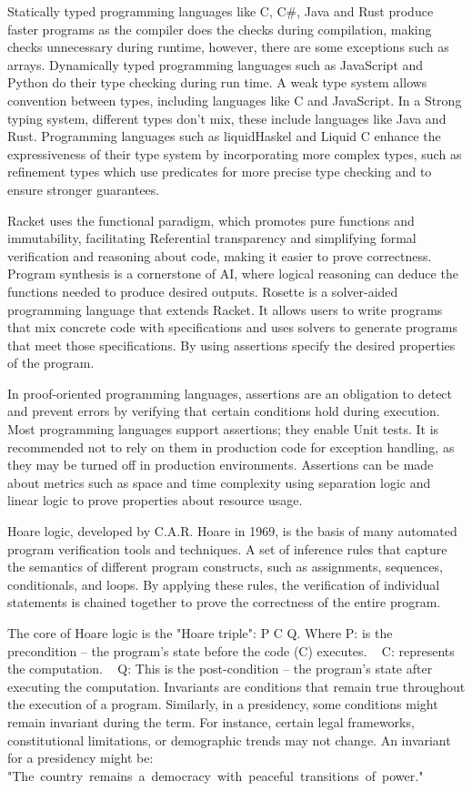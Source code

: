 \documentclass{article}
\begin{document}
Statically typed programming languages like C,  C\#, Java and Rust produce faster programs as the compiler does the checks during compilation, making checks unnecessary during runtime, however, there are some exceptions such as arrays. Dynamically typed programming languages such as JavaScript and Python do their type checking during run time. A weak type system allows convention between types, including languages like C and JavaScript. In a Strong typing system, different types don't mix, these include languages like Java and Rust. Programming languages such as liquidHaskel and Liquid C enhance the expressiveness of their type system by incorporating more complex types, such as refinement types which use predicates for more precise type checking and to ensure stronger guarantees.
 
Racket uses the functional paradigm, which promotes pure functions and immutability, facilitating Referential transparency and simplifying formal verification and reasoning about code, making it easier to prove correctness. Program synthesis is a cornerstone of AI, where logical reasoning can deduce the functions needed to produce desired outputs.  Rosette is a solver-aided programming language that extends Racket. It allows users to write programs that mix concrete code with specifications and uses solvers to generate programs that meet those specifications. By using assertions specify the desired properties of the program.

In proof-oriented programming languages, assertions are an obligation to detect and prevent errors by verifying that certain conditions hold during execution. Most programming languages support assertions; they enable Unit tests. It is recommended not to rely on them in production code for exception handling, as they may be turned off in production environments. Assertions can be made about metrics such as space and time complexity using separation logic and linear logic to prove properties about resource usage. 

Hoare logic, developed by C.A.R. Hoare in 1969, is the basis of many automated program verification tools and techniques. A set of inference rules that capture the semantics of different program constructs, such as assignments, sequences, conditionals, and loops. By applying these rules, the verification of individual statements is chained together to prove the correctness of the entire program. 

The core of Hoare logic is the "Hoare triple": {P} C {Q}. Where P:  is the precondition –  the program's state before the code (C) executes.   C: represents the computation.   Q: This is the post-condition – the program's state after executing the computation.  Invariants are conditions that remain true throughout the execution of a program. Similarly, in a presidency, some conditions might remain invariant during the term. For instance, certain legal frameworks, constitutional limitations, or demographic trends may not change. An invariant for a presidency might be: "The country remains a democracy with peaceful transitions of power." 
\end{document}

